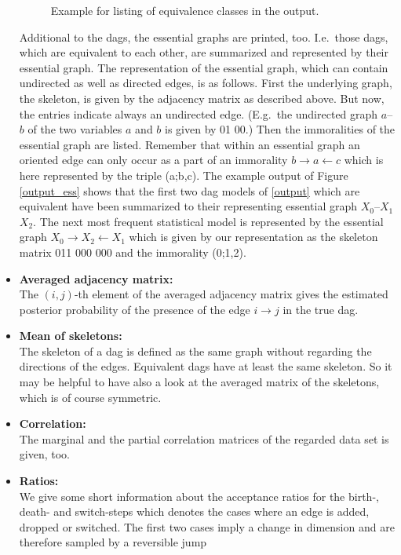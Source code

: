\begin{itemize}
\begin{figure}
{}
{\em\caption{\label{output_ess} Example for listing of equivalence
classes in the output.}}
\end{figure}
Additional to the dags, the essential graphs are printed, too.
I.e.~those dags, which are equivalent to each other, are
summarized and represented by their essential graph. The
representation of the essential graph, which can contain
undirected as well as directed edges, is as follows. First the
underlying graph, the skeleton, is given by the adjacency matrix
as described above. But now, the entries indicate always an
undirected edge. (E.g.~the undirected graph $a$--$b$ of the two
variables $a$ and $b$ is given by 01 00.) Then the immoralities of
the essential graph are listed. Remember that within an essential
graph an oriented edge can only occur as a part of an immorality
$b \rightarrow a \leftarrow c$ which is here represented by the
triple (a;b,c). The example output of Figure \autoref{output_ess}
shows that the first two dag models of \autoref{output} which are
equivalent have been summarized to their representing essential
graph $X_0$--$X_1$ $X_2$. The next most frequent statistical model
is represented by the essential graph $X_0 \rightarrow X_2
\leftarrow X_1$ which is given by our representation as the
skeleton matrix 011 000 000 and the immorality (0;1,2).
%
%
\item {\bf\sffamily Averaged adjacency matrix:}\\
The $(i,j)$-th element of the averaged adjacency matrix gives the
estimated posterior probability of the presence of the edge $i
\rightarrow j$ in the true dag.
\item {\bf\sffamily Mean of skeletons:}\\
The skeleton of a dag is defined as the same graph without
regarding the directions of the edges. Equivalent dags have at
least the same skeleton. So it may be helpful to have also a look
at the averaged matrix of the skeletons, which is of course
symmetric.
\item {\bf\sffamily Correlation:}\\
The marginal and the partial correlation matrices of the regarded
data set is given, too.
\item {\bf\sffamily Ratios:}\\
We give some short information about the acceptance ratios for the
birth-, death- and switch-steps which denotes the cases where an
edge is added, dropped or switched. The first two cases imply a
change in dimension and are therefore sampled by a reversible jump

\end{itemize}
